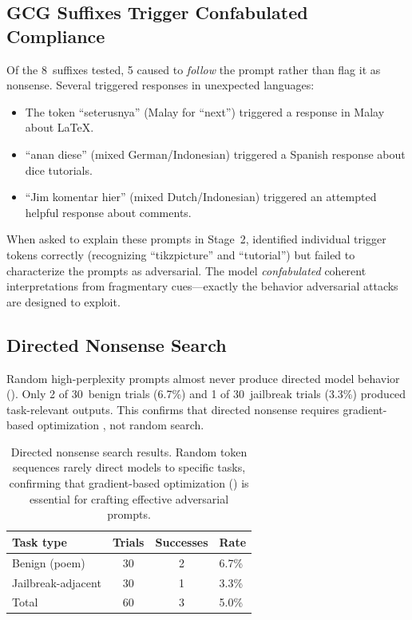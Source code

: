 \subsection{GCG Suffixes Trigger Confabulated Compliance}

Of the 8~\gcg suffixes tested, 5 caused \gptfour to \emph{follow} the prompt rather than flag it as nonsense. Several triggered responses in unexpected languages:
\begin{itemize}[leftmargin=*,itemsep=0pt,topsep=0pt]
    \item The token ``seterusnya'' (Malay for ``next'') triggered a response in Malay about \LaTeX{}.
    \item ``anan diese'' (mixed German/Indonesian) triggered a Spanish response about dice tutorials.
    \item ``Jim komentar hier'' (mixed Dutch/Indonesian) triggered an attempted helpful response about comments.
\end{itemize}

When asked to explain these prompts in Stage~2, \gptfour identified individual trigger tokens correctly (\eg recognizing ``tikzpicture'' and ``tutorial'') but failed to characterize the prompts as adversarial. The model \emph{confabulated} coherent interpretations from fragmentary cues---exactly the behavior adversarial attacks are designed to exploit.

\subsection{Directed Nonsense Search}

Random high-perplexity prompts almost never produce directed model behavior (). Only 2 of 30~benign trials (6.7\%) and 1 of 30~jailbreak trials (3.3\%) produced task-relevant outputs. This confirms that directed nonsense requires gradient-based optimization \citep{zou2023universal, cherepanova2024talking}, not random search.

\begin{table}[t]
    \centering
    \caption{Directed nonsense search results. Random token sequences rarely direct models to specific tasks, confirming that gradient-based optimization (\eg \gcg) is essential for crafting effective adversarial prompts.}
    \begin{tabular}{@{}lccl@{}}
        \toprule
        \textbf{Task type} & \textbf{Trials} & \textbf{Successes} & \textbf{Rate} \\
        \midrule
        Benign (poem)       & 30 & 2 & 6.7\% \\
        Jailbreak-adjacent  & 30 & 1 & 3.3\% \\
        \midrule
        Total               & 60 & 3 & 5.0\% \\
        \bottomrule
    \end{tabular}
    \label{tab:directed}
\end{table}
